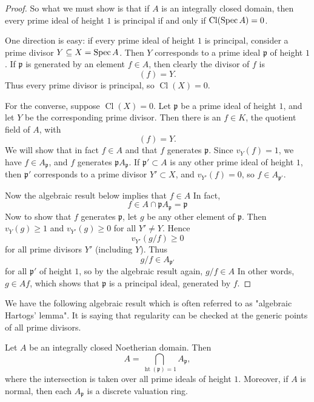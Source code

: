 \documentclass[12pt]{article}
\begin{document}
\begin{proof}
    So what we must show is that if $A$ is an integrally closed domain, then every prime ideal of height $1$ is principal if and only if $\operatorname{Cl}(\operatorname{Spec} A)=0$.

    One direction is easy: if every prime ideal of height $1$ is principal, consider a prime divisor $Y \subseteq X=\operatorname{Spec} A$. Then $Y$ corresponds to a prime ideal $\mathfrak p$ of height $1$. If $\mathfrak p$ is generated by an element $f\in A$, then clearly the divisor of $f$ is
    \[
        (f)=Y.
    \]
    Thus every prime divisor is principal, so $\operatorname{Cl}(X)=0$.

    For the converse, suppose $\operatorname{Cl}(X)=0$. Let $\mathfrak p$ be a prime ideal of height $1$, and let $Y$ be the corresponding prime divisor. Then there is an $f\in K$, the quotient field of $A$, with
    \[
        (f)=Y.
    \]
    We will show that in fact $f\in A$ and that $f$ generates $\mathfrak p$. Since $v_Y(f)=1$, we have $f\in A_{\mathfrak p}$, and $f$ generates $\mathfrak p A_{\mathfrak p}$. If $\mathfrak p' \subset A$ is any other prime ideal of height $1$, then $\mathfrak p'$ corresponds to a prime divisor $Y' \subset X$, and $v_{Y'}(f)=0$, so $f\in A_{\mathfrak p'}$.

    Now the algebraic result below implies that $f\in A$
    In fact,
    \[
        f\in A\cap \mathfrak p A_{\mathfrak p}=\mathfrak p
    \]
    Now to show that $f$ generates $\mathfrak p$, let $g$ be any other element of $\mathfrak p$. Then $v_Y(g)\ge 1$ and $v_{Y'}(g)\ge 0$ for all $Y'\neq Y$. Hence
    \[
        v_{Y'}(g/f)\ge 0
    \]
    for all prime divisors $Y'$ (including $Y$). Thus
    \[
        g/f \in A_{\mathfrak p'}
    \]
    for all $\mathfrak p'$ of height $1$, so by the algebraic result again, $g/f \in A$
    In other words, $g\in Af$, which shows that $\mathfrak p$ is a principal ideal, generated by $f$.
\end{proof}

We have the following algebraic result which is often referred to as "algebraic Hartogs' lemma". It is saying that regularity can be checked at the generic points of all prime divisors.
\begin{theorem}
    Let $A$ be an integrally closed Noetherian domain. Then
    \[
        A=\bigcap_{\operatorname{ht}(\mathfrak p)=1} A_{\mathfrak p},
    \]
    where the intersection is taken over all prime ideals of height $1$. Moreover, if $A$ is normal, then each $A_{\mathfrak p}$ is a discrete valuation ring.
\end{theorem}
\end{document}
